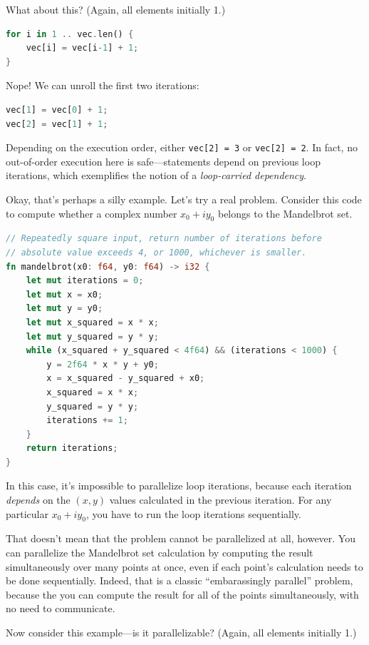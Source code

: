 \documentclass[a4paper]{report}
\begin{document}
What about this? (Again, all elements initially 1.)

\begin{lstlisting}[language=Rust]
for i in 1 .. vec.len() {
    vec[i] = vec[i-1] + 1;
}
\end{lstlisting}

Nope! We can unroll the first two iterations:
\begin{lstlisting}[language=Rust]
vec[1] = vec[0] + 1;
vec[2] = vec[1] + 1;
\end{lstlisting}

Depending on the execution order, either {\tt vec[2] = 3} or {\tt vec[2] =
  2}.  In fact, no out-of-order execution here is safe---statements depend
on previous loop iterations, which exemplifies the notion of a
\emph{loop-carried dependency}. 

Okay, that's perhaps a silly example. 
Let's try a real problem. Consider this code to compute whether a complex number $x_0 + iy_0$ belongs to the Mandelbrot set.

\begin{lstlisting}[language=Rust]
// Repeatedly square input, return number of iterations before
// absolute value exceeds 4, or 1000, whichever is smaller.
fn mandelbrot(x0: f64, y0: f64) -> i32 {
    let mut iterations = 0;
    let mut x = x0;
    let mut y = y0;
    let mut x_squared = x * x;
    let mut y_squared = y * y;
    while (x_squared + y_squared < 4f64) && (iterations < 1000) {
        y = 2f64 * x * y + y0;
        x = x_squared - y_squared + x0;
        x_squared = x * x;
        y_squared = y * y;
        iterations += 1;
    }
    return iterations;
}
\end{lstlisting}
In this case, it's impossible to parallelize loop iterations, because
each iteration \emph{depends} on the $(x, y)$ values calculated in the
previous iteration. For any particular $x_0 + iy_0$, you have to run the
loop iterations sequentially.

That doesn't mean that the problem cannot be parallelized at all, however.
You can parallelize the Mandelbrot set calculation
by computing the result simultaneously over many points at
once, even if each point's calculation needs to be done sequentially.
Indeed, that is a classic ``embarassingly parallel'' problem,
because the you can compute the result for all of the points
simultaneously, with no need to communicate.

 Now consider this example---is it parallelizable? (Again, all elements initially 1.)
\end{document}
